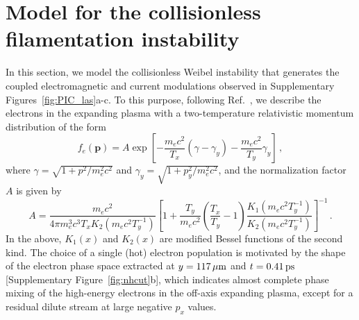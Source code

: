 \documentclass[aps,superscriptaddress]{revtex4}
\begin{document}
\section{Model for the collisionless filamentation instability} \label{sec:dispe_weibel}

In this section, we model the collisionless Weibel instability that generates the coupled electromagnetic and current modulations observed in Supplementary Figures~\ref{fig:PIC_las}a-c. To this purpose, following Ref.~\cite{POP_Yoon_2007b}, we describe the electrons in the expanding plasma with a two-temperature relativistic momentum distribution of the form
\begin{equation}
    f_e(\mathbf{p}) = A \exp\left[ -\frac{m_ec^2}{T_x}(\gamma -\gamma_y) -\frac{m_ec^2}{T_y}\gamma_y \right] \,,
\end{equation}
where $\gamma=\sqrt{1 + p^2/m_e^2c^2}$ and $\gamma_y=\sqrt{1 + p_y^2/m_e^2c^2}$,  
and the normalization factor $A$ is given by
\begin{equation}
    A = \frac{m_ec^2}{4\pi m_e^3c^3T_xK_2(m_ec^2T_y^{-1}) } \left[1 + \frac{T_y}{m_ec^2} \left(\frac{T_x}{T_y}-1\right)\frac{K_1(m_ec^2 T_y^{-1})}{K_2(m_ec^2T_y^{-1})} \right]^{-1} \,.
\end{equation}
In the above, $K_1(x)$ and $K_2(x)$ are modified Bessel functions of the second kind. The choice of a single (hot) electron population is motivated by the shape of the electron phase space extracted at $y=117\,\rm\mu m$ and $t=0.41\,\rm ps$ [Supplementary Figure~\ref{fig:nhcut}b], which indicates almost complete phase mixing of the high-energy electrons in the off-axis expanding plasma, except for a residual dilute stream at large negative $p_x$ values.
\end{document}
